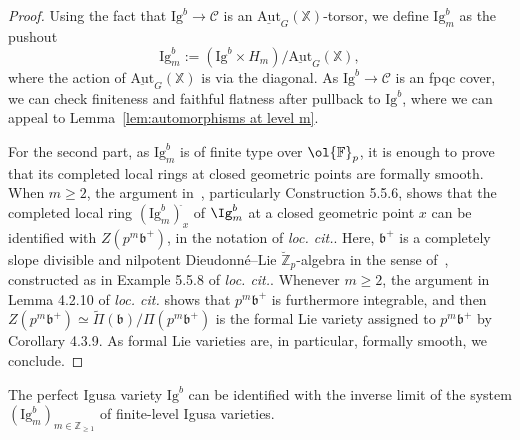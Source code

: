 \documentclass[letterpaper,11pt]{amsart}
\begin{document}
\begin{proof} Using the fact that $\mathrm{Ig}^b\to \mathscr{C}$ is an $\underline{\mathrm{Aut}}_G(\mathbb{X})$-torsor, we define $\mathrm{Ig}^b_m$ as the pushout
\[
\mathrm{Ig}^b_m:=\left(\mathrm{Ig}^b\times H_m\right)/\underline{\mathrm{Aut}}_G(\mathbb{X}),
\]
where the action of $\underline{\mathrm{Aut}}_G(\mathbb{X})$ is via the diagonal. As $\mathrm{Ig}^b\to \mathscr{C}$ is an fpqc cover, we can check finiteness and faithful flatness after pullback to $\mathrm{Ig}^b$, where we can appeal to Lemma~\ref{lem:automorphisms at level m}. 

For the second part, as $\mathrm{Ig}^b_m$ is of finite type over $\ol{\mathbb{F}}_p$, it is enough to prove that its completed local rings at closed geometric points are formally smooth. When $m\geq 2$, the argument in~\cite[\S 5.5]{DAVH}, particularly Construction 5.5.6, shows that the completed local ring $(\mathrm{Ig}^b_m)^{\hat{}}_{x}$ of $\Ig^{b}_{m}$ at a closed geometric point $x$ can be identified with $Z(p^m\mathfrak{b}^+)$, in the notation of \emph{loc. cit.}. Here, $\mathfrak{b}^+$ is a completely slope divisible and nilpotent Dieudonn\'e--Lie $\breve{\mathbb{Z}}_p$-algebra in the sense of~\cite[\S 4.2]{DAVH}, constructed as in Example 5.5.8 of \emph{loc. cit.}. Whenever $m\geq 2$, the argument in Lemma 4.2.10 of \emph{loc. cit.} shows that  $p^m\mathfrak{b}^+$ is furthermore integrable, and then $Z(p^m\mathfrak{b}^+) \simeq \tilde{\Pi}(\mathfrak{b})/\Pi(p^m\mathfrak{b}^+)$ is the formal Lie variety assigned to $p^m\mathfrak{b}^+$ by Corollary 4.3.9. As formal Lie varieties are, in particular, formally smooth, we conclude. 
 \end{proof}

  The perfect Igusa variety $\mathrm{Ig}^b$ can be identified with the inverse limit of the system $(\mathrm{Ig}^b_m)_{m\in \mathbb{Z}_{\geq 1}}$ of finite-level Igusa varieties.
\end{document}
